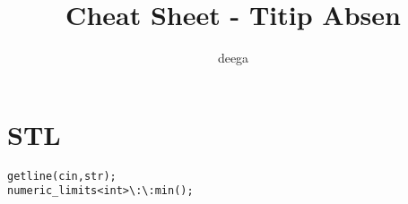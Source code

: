 \documentclass[a4paper]{article}
\title{\textbf{Cheat Sheet - Titip Absen}}
\author{deega}
\date{}
\begin{document}
\maketitle
\thispagestyle{empty}

{\footnotesize\tableofcontents}

\section{STL}
\begin{verbatim}
getline(cin,str);
numeric_limits<int>\:\:min();
\end{verbatim}
\end{document}
